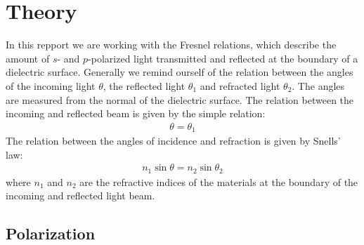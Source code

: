 \section{Theory}
In this repport we are working with the Fresnel relations, which describe the amount of $s$- and $p$-polarized light transmitted and reflected at the boundary of a dielectric surface. Generally we remind ourself of the relation between the angles of the incoming light $\theta$, the reflected light $\theta_1$ and refracted light $\theta_2$. The angles are measured from the normal of the dielectric surface.
The relation between the incoming and reflected beam is given by the simple relation:
%
\begin{align}
\theta = \theta_1
\end{align}
%
The relation between the angles of incidence and refraction is given by Snells' law:
%
\begin{align}
n_1\sin{\theta}=n_2\sin{\theta_2}
\end{align}
%
where $n_1$ and $n_2$ are the refractive indices of the materials at the boundary of the incoming and reflected light beam.

\subsection{Polarization}

